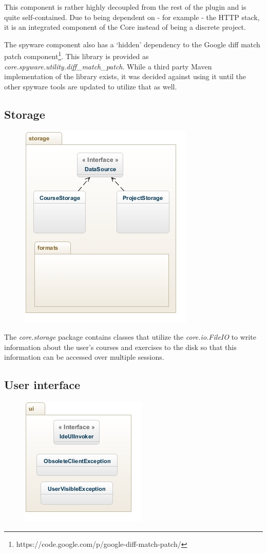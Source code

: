 \documentclass[12pt,a4paper,english,leqno]{article}
\begin{document}
This component is rather highly decoupled from the rest of the plugin and is quite self-contained.
Due to being dependent on - for example - the HTTP stack, it is an integrated component of the Core instead of being a discrete project. 

The spyware component also has a `hidden' dependency to the Google diff match patch component\footnote{https://code.google.com/p/google-diff-match-patch/}.
This library is provided as \textit{core.spyware.utility.diff\_match\_patch}.
While a third party Maven implementation of the library exists, it was decided against using it until the other spyware tools are updated to utilize that as well.

\subsection{Storage}

\begin{figure}[H]
\centering
\includegraphics[scale=1]{img/storage.jpg}
\end{figure}

The \textit{core.storage} package contains classes that utilize the \textit{core.io.FileIO} to write information about the user's courses and exercises to the disk so that this information can be accessed over multiple sessions.

\subsection{User interface}

\begin{figure}[H]
\centering
\includegraphics[scale=1]{img/ui.jpg}
\end{figure}
\end{document}

